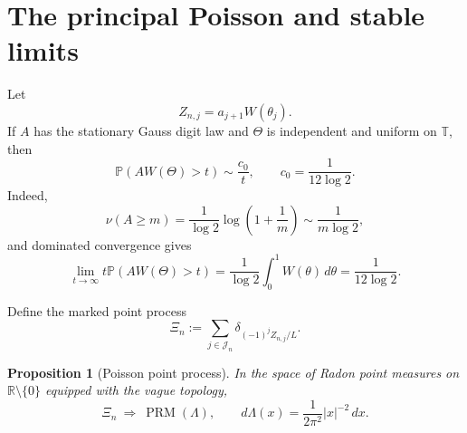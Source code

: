 \documentclass[11pt,a4paper]{amsart}
\newtheorem{proposition}[theorem]{Proposition}
\theoremstyle{definition}
\theoremstyle{remark}
\newcommand{\T}{\mathbb T}
\newcommand{\R}{\mathbb R}
\newcommand{\Pp}{\mathbb P}
\begin{document}
\section{The principal Poisson and stable limits}

Let
\[
 Z_{n,j}=a_{j+1}W(\theta_j).
\]
If $A$ has the stationary Gauss digit law and $\Theta$ is independent and
uniform on $\T$, then
\begin{equation}\label{eq:stationary-tail}
 \Pp(AW(\Theta)>t)\sim\frac{c_0}{t},
 \qquad c_0=\frac1{12\log2}.
\end{equation}
Indeed,
\[
 \nu(A\ge m)=\frac1{\log2}\log\left(1+\frac1m\right)
 \sim\frac1{m\log2},
\]
and dominated convergence gives
\[
 \lim_{t\to\infty}t\Pp(AW(\Theta)>t)
 =\frac1{\log2}\int_0^1W(\theta)\,d\theta
 =\frac1{12\log2}.
\]

Define the marked point process
\begin{equation}\label{eq:Xi-def}
 \Xi_n:=\sum_{j\in\mathcal J_n}\delta_{(-1)^jZ_{n,j}/L}.
\end{equation}

\begin{proposition}[Poisson point process]\label{prop:PPP}
In the space of Radon point measures on $\R\setminus\{0\}$ equipped with
the vague topology,
\begin{equation}\label{eq:PPP}
 \Xi_n
 \ \Longrightarrow\
 \operatorname{PRM}(\Lambda),
 \qquad
 d\Lambda(x)=\frac1{2\pi^2}|x|^{-2}\,dx.
\end{equation}
\end{proposition}
\end{document}
